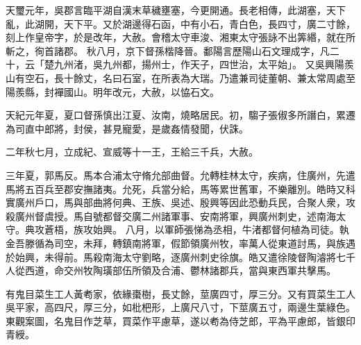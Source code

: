 \begin{pinyinscope}
天璽元年，吳郡言臨平湖自漢末草穢壅塞，今更開通。長老相傳，此湖塞，天下亂，此湖開，天下平。又於湖邊得石函，中有小石，青白色，長四寸，廣二寸餘，刻上作皇帝字，於是改年，大赦。會稽太守車浚、湘東太守張詠不出筭緡，就在所斬之，徇首諸郡。
秋八月，京下督孫楷降晉。鄱陽言歷陽山石文理成字，凡二十，云「楚九州渚，吳九州都，揚州士，作天子，四世治，太平始」。
又吳興陽羨山有空石，長十餘丈，名曰石室，在所表為大瑞。乃遣兼司徒董朝、兼太常周處至陽羨縣，封襌國山。明年改元，大赦，以恊石文。


天紀元年夏，夏口督孫慎出江夏、汝南，燒略居民。初，騶子張俶多所譖白，累遷為司直中郎將，封侯，甚見寵愛，是歲姦情發聞，伏誅。


二年秋七月，立成紀、宣威等十一王，王給三千兵，大赦。


三年夏，郭馬反。馬本合浦太守脩允部曲督。允轉桂林太守，疾病，住廣州，先遣馬將五百兵至郡安撫諸夷。允死，兵當分給，馬等累世舊軍，不樂離別。皓時又科實廣州戶口，馬與部曲將何典、王族、吳述、殷興等因此恐動兵民，合聚人衆，攻殺廣州督虞授。馬自號都督交廣二州諸軍事、安南將軍，興廣州刺史，述南海太守。典攻蒼梧，族攻始興。
八月，以軍師張悌為丞相，牛渚都督何植為司徒。執金吾滕循為司空，未拜，轉鎮南將軍，假節領廣州牧，率萬人從東道討馬，與族遇於始興，未得前。馬殺南海太守劉略，逐廣州刺史徐旗。皓又遣徐陵督陶濬將七千人從西道，命交州牧陶璜部伍所領及合浦、鬱林諸郡兵，當與東西軍共擊馬。


有鬼目菜生工人黃耇家，依緣棗樹，長丈餘，莖廣四寸，厚三分。又有買菜生工人吳平家，高四尺，厚三分，如枇杷形，上廣尺八寸，下莖廣五寸，兩邊生葉綠色。東觀案圖，名鬼目作芝草，買菜作平慮草，遂以耇為侍芝郎，平為平慮郎，皆銀印青綬。



\end{pinyinscope}

